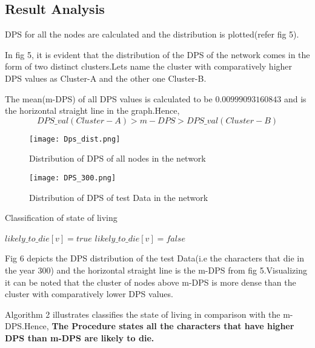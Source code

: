 \documentclass[conference]{IEEEtran}
\begin{document}
\subsection{Result Analysis}
DPS for all the nodes are calculated and the distribution is plotted(refer fig 5).

In fig 5, it is evident that the distribution of the DPS of the network comes in the form of two distinct clusters.Lets name the cluster with comparatively higher DPS values as Cluster-A and the other one Cluster-B.

The mean(m-DPS) of all DPS values is calculated to be $0.00999093160843$ and is the horizontal straight line in the graph.Hence,
$$DPS\_val(Cluster-A) > m-DPS > DPS\_val(Cluster-B)$$
\begin{figure}
    \centering
    \texttt{[image: Dps\_dist.png]}
    \caption{Distribution of DPS of all nodes in the network}
    \label{fig:5}
\end{figure}

\begin{figure}
    \centering
    \captionsetup{width=0.9\linewidth}
    \texttt{[image: DPS\_300.png]}
    \caption{Distribution of DPS of test Data in the network}
    \label{fig:6}
\end{figure}



\begin{algorithm}
    \caption{Classification of state of living}
    \begin{algorithmic}
                \STATE $likely\_to\_die[v]={true}$
            \ELSE
                \STATE $likely\_to\_die[v]={false}$
            \ENDIF
        \ENDFOR
    \end{algorithmic}
\end{algorithm}

Fig 6 depicts the DPS distribution of the test Data(i.e the characters that die in the year 300) and the horizontal straight line is the m-DPS from fig 5.Visualizing it can be noted that the cluster of nodes above m-DPS is more dense than the cluster with comparatively lower DPS values.

Algorithm 2  illustrates classifies the state of living in comparison with the m-DPS.Hence, \textbf{The Procedure states all the characters that have higher DPS than m-DPS are likely to die.}
\end{document}
